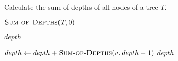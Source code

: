 
\begin{algorithm}[H]
  \caption{Calculate the sum of depths of all nodes of a tree $T$.}
  \label{alg:sum-of-depths}
  \begin{algorithmic}[1]
      \State \Return $\Call{Sum-of-Depths}{T, 0}$ 
    \EndProcedure

    \Statex
     
        \State \Return $depth$
      \EndIf

      \hStatex
	\State $depth \gets depth + \Call{Sum-of-Depths}{v, depth + 1}$
      \EndFor
      \State \Return $depth$
    \EndProcedure
  \end{algorithmic}
\end{algorithm}
